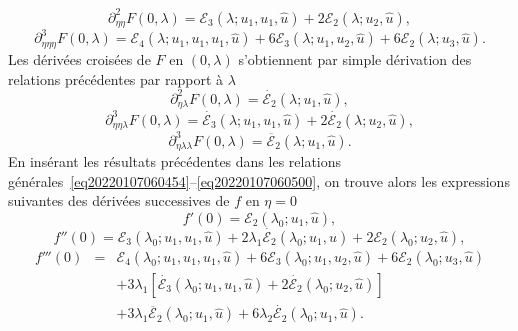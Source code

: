 \documentclass[12pt, final]{amsart}
\begin{document}
\begin{equation}
  \partial_{\eta  \eta}^2 F (0, \lambda) =\mathcal{E}_3 (\lambda ;
  u_1, u_1, \hat{u}) + 2\mathcal{E}_2 (\lambda ; u_2, \hat{u}),
\end{equation}
\begin{equation}
  \partial_{\eta  \eta  \eta}^3 F (0, \lambda) =\mathcal{E}_4
  (\lambda ; u_1, u_1, u_1, \hat{u}) + 6\mathcal{E}_3 (\lambda ; u_1, u_2,
  \hat{u}) + 6\mathcal{E}_2 (\lambda ; u_3, \hat{u}) .
\end{equation}
Les dérivées croisées de $F$ en $(0, \lambda)$ s'obtiennent par
simple dérivation des relations précédentes par rapport à
$\lambda$
\begin{equation}
  \partial_{\eta  \lambda}^2 F (0, \lambda) = \dot{\mathcal{E}_2}
  (\lambda ; u_1, \hat{u}),
\end{equation}
\begin{equation}
  \partial_{\eta  \eta  \lambda}^3 F (0, \lambda) =
  \dot{\mathcal{E}_3} (\lambda ; u_1, u_1, \hat{u}) + 2 \dot{\mathcal{E}_2}
  (\lambda ; u_2, \hat{u}),
\end{equation}
\begin{equation}
  \partial_{\eta  \lambda  \lambda}^3 F (0, \lambda) =
  \ddot{\mathcal{E}_2} (\lambda ; u_1, \hat{u}) .
\end{equation}
En insérant les résultats précédentes dans les relations
générales~\eqref{eq20220107060454}--\eqref{eq20220107060500}, on
trouve alors les expressions suivantes des dérivées successives de $f$
en $\eta = 0$
\begin{equation}
  f' (0) =\mathcal{E}_2 (\lambda_0 ; u_1, \hat{u}),
\end{equation}
\begin{equation}
  f'' (0) =\mathcal{E}_3 (\lambda_0 ; u_1, u_1, \hat{u}) + 2 \lambda_1
  \dot{\mathcal{E}_2} (\lambda_0 ; u_1, \hat{u}) + 2\mathcal{E}_2 (\lambda_0 ;
  u_2, \hat{u}),
\end{equation}
\begin{eqnarray}
  f''' (0) & = & \mathcal{E}_4 (\lambda_0 ; u_1, u_1, u_1, \hat{u}) +
  6\mathcal{E}_3 (\lambda_0 ; u_1, u_2, \hat{u}) + 6\mathcal{E}_2 (\lambda_0 ;
  u_3, \hat{u}) \nonumber\\
  &  &  + 3 \lambda_1  [\dot{\mathcal{E}_3} (\lambda_0 ; u_1, u_1,
  \hat{u}) + 2 \dot{\mathcal{E}_2} (\lambda_0 ; u_2, \hat{u})] \nonumber\\
  &  &  + 3 \lambda_1   \ddot{\mathcal{E}_2} (\lambda_0 ; u_1,
  \hat{u}) + 6 \lambda_2  \dot{\mathcal{E}_2} (\lambda_0 ; u_1, \hat{u}) .
\end{eqnarray}
\end{document}
